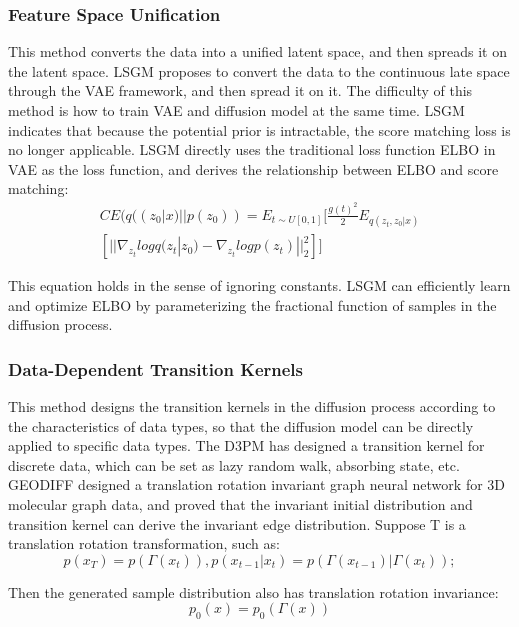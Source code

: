 \documentclass[conference]{IEEEtran}
\begin{document}
\subsubsection{Feature Space Unification}

This method converts the data into a unified latent space, and then spreads it on the latent space. LSGM proposes to convert the data to the continuous late space through the VAE framework, and then spread it on it. The difficulty of this method is how to train VAE and diffusion model at the same time. LSGM indicates that because the potential prior is intractable, the score matching loss is no longer applicable. LSGM directly uses the traditional loss function ELBO in VAE as the loss function, and derives the relationship between ELBO and score matching:
\begin{equation}
\begin{aligned}
    CE(q((z_0|x)||p(z_0))=E_{t\sim U[0,1]}[\frac{g(t)^2}{2}E_{q(z_t,z_0|x)}\\
    [||\nabla_{z_t}logq(z_t|z_0)-\nabla_{z_t}logp(z_t)||_2^2]]
\end{aligned}
\end{equation}

This equation holds in the sense of ignoring constants. LSGM can efficiently learn and optimize ELBO by parameterizing the fractional function of samples in the diffusion process.

\subsubsection{Data-Dependent Transition Kernels}

This method designs the transition kernels in the diffusion process according to the characteristics of data types, so that the diffusion model can be directly applied to specific data types. The D3PM has designed a transition kernel for discrete data, which can be set as lazy random walk, absorbing state, etc. GEODIFF designed a translation rotation invariant graph neural network for 3D molecular graph data, and proved that the invariant initial distribution and transition kernel can derive the invariant edge distribution. Suppose T is a translation rotation transformation, such as:
\begin{equation}
    p(x_T)=p(\Gamma(x_t)),p(x_{t-1}|x_t)=p(\Gamma(x_{t-1})|\Gamma(x_t));
\end{equation}

Then the generated sample distribution also has translation rotation invariance:
\begin{equation}
    p_0(x)=p_0(\Gamma(x))
\end{equation}
\end{document}
